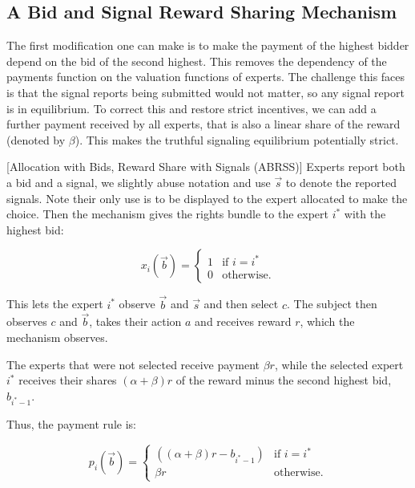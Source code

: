 \subsection{A Bid and Signal Reward Sharing Mechanism}

The first modification one can make is to make the payment of the highest bidder depend on the bid of the second highest. This removes the dependency of the payments function on the valuation functions of experts.
The challenge this faces is that the signal reports being submitted would not matter, so any signal report is in equilibrium. To correct this and restore strict incentives, we can add a further payment received by all experts, that is also a linear share of the reward (denoted by $\beta$). This makes the truthful signaling equilibrium potentially strict.


\begin{mech}\label{mech:Direct}[Allocation with Bids, Reward Share with Signals (ABRSS)]
	Experts report both a bid and a signal, we slightly abuse notation and use $\vec s$ to denote the reported signals. Note their only use is to be displayed to the expert allocated to make the choice.
	Then the mechanism gives the rights bundle to the expert $i^*$ with the highest bid:
	
   $$x_i(\vec{b}) = \begin{cases} 1 & \text{if } i = i^* \\ 0 & \text{otherwise.} \end{cases}$$
	
      This lets the expert $i^*$ observe  $\vec{b}$ and $\vec s$ and then select $c$. The subject then observes $c$ and $\vec{b}$, takes their action $a$ and receives reward $r$, which the mechanism observes. 

	The experts that were not selected receive  payment $\beta r$, while the selected expert $i^*$ receives their shares $(\alpha + \beta) r$ of the reward minus the second highest bid, $b_{i^*-1}$.

	Thus, the payment rule is:
	
   $$p_i(\vec b)= \begin{cases} ((\alpha + \beta)r - b_{i^*-1})& \text{if }i = i^* \\ \beta r & \text{otherwise.} \end{cases}$$
\end{mech}



